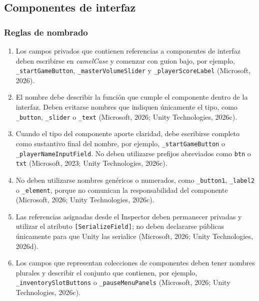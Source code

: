 \subsection{Componentes de interfaz}

\subsubsection{Reglas de nombrado}

\begin{enumerate}
    \item Los campos privados que contienen referencias a componentes de interfaz deben escribirse en \textit{camelCase} y comenzar con guion bajo, por ejemplo, \texttt{\_startGameButton}, \texttt{\_masterVolumeSlider} y \texttt{\_playerScoreLabel} (Microsoft, 2026).

    \item El nombre debe describir la función que cumple el componente dentro de la interfaz. Deben evitarse nombres que indiquen únicamente el tipo, como \texttt{\_button}, \texttt{\_slider} o \texttt{\_text} (Microsoft, 2026; Unity Technologies, 2026c).

    \item Cuando el tipo del componente aporte claridad, debe escribirse completo como sustantivo final del nombre, por ejemplo, \texttt{\_startGameButton} o \texttt{\_playerNameInputField}. No deben utilizarse prefijos abreviados como \texttt{btn} o \texttt{txt} (Microsoft, 2023; Unity Technologies, 2026c).

    \item No deben utilizarse nombres genéricos o numerados, como \texttt{\_button1}, \texttt{\_label2} o \texttt{\_element}, porque no comunican la responsabilidad del componente (Microsoft, 2026; Unity Technologies, 2026c).

    \item Las referencias asignadas desde el Inspector deben permanecer privadas y utilizar el atributo \texttt{[SerializeField]}; no deben declararse públicas únicamente para que Unity las serialice (Microsoft, 2026; Unity Technologies, 2026d).

    \item Los campos que representan colecciones de componentes deben tener nombres plurales y describir el conjunto que contienen, por ejemplo, \texttt{\_inventorySlotButtons} o \texttt{\_pauseMenuPanels} (Microsoft, 2026; Unity Technologies, 2026c).
\end{enumerate}

